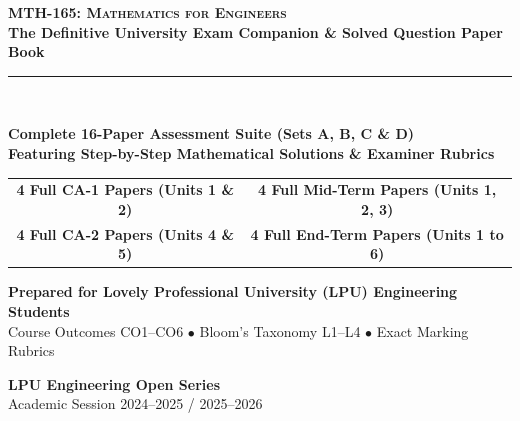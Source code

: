 \begin{titlepage}
\pagecolor{LPUNavy}
\color{white}
\vspace*{1.5cm}

\begin{center}
    {\Huge \bfseries \scshape MTH-165: Mathematics for Engineers}\\[5mm]
    {\LARGE \bfseries The Definitive University Exam Companion \& Solved Question Paper Book}\\[8mm]
    {\color{LPUOrange}\rule{0.8\textwidth}{2pt}}\\[10mm]

    \begin{tcolorbox}[enhanced, width=0.88\textwidth, colback=white, colframe=LPUOrange, boxrule=1.5pt, arc=3mm, halign=center]
        \color{DarkSlate}
        \vspace{2mm}
        {\Large\bfseries Complete 16-Paper Assessment Suite (Sets A, B, C \& D)}\\[3mm]
        {\large\bfseries Featuring Step-by-Step Mathematical Solutions \& Examiner Rubrics}\\[3mm]
        \begin{tabular}{cc}
            \color{LPUNavy}\textbf{4 Full CA-1 Papers (Units 1 \& 2)} & \quad \color{LPUNavy}\textbf{4 Full Mid-Term Papers (Units 1, 2, 3)} \\
            \color{LPUNavy}\textbf{4 Full CA-2 Papers (Units 4 \& 5)} & \quad \color{LPUNavy}\textbf{4 Full End-Term Papers (Units 1 to 6)} \\
        \end{tabular}
        \vspace{2mm}
    \end{tcolorbox}

    \vfill

    {\large \bfseries Prepared for Lovely Professional University (LPU) Engineering Students}\\[2mm]
    {\small Course Outcomes CO1--CO6 $\bullet$ Bloom's Taxonomy L1--L4 $\bullet$ Exact Marking Rubrics}\\[10mm]

    \begin{tcolorbox}[width=0.6\textwidth, colback=LPUNavy!80!black, colframe=white, boxrule=0.5pt, halign=center]
        \color{white}
        \textbf{LPU Engineering Open Series}\\[1mm]
        {\footnotesize Academic Session 2024--2025 / 2025--2026}
    \end{tcolorbox}
    \vspace*{1cm}
\end{center}
\end{titlepage}
\nopagecolor
\newpage
